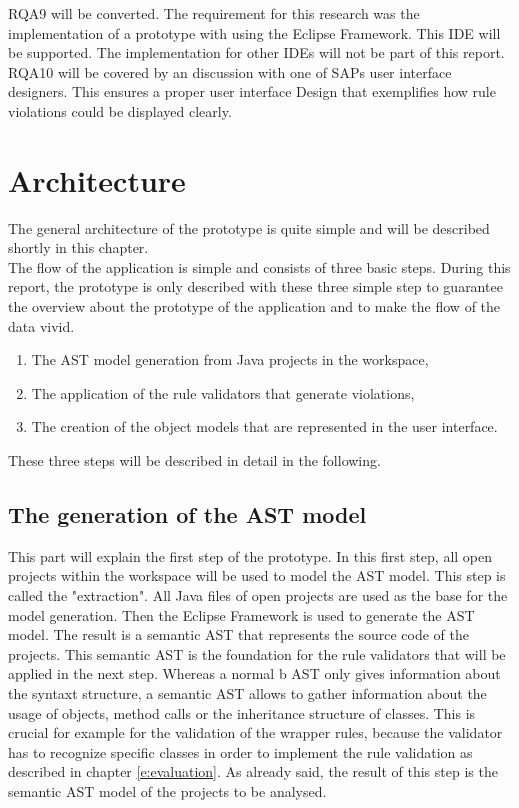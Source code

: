 RQA9 will be converted. The requirement for this research was the implementation of a prototype with using the Eclipse Framework. This \acf{IDE} will be supported. The implementation for other \acf{IDE}s will not be part of this report.
\\

RQA10 will be covered by an discussion with one of SAPs user interface designers. This ensures a proper user interface Design that exemplifies how rule violations could be displayed clearly.
\\

\section{Architecture}
\label{p:architecture}
The general architecture of the prototype is quite simple and will be described shortly in this chapter. 
\\

The flow of the application is simple and consists of three basic steps. During this report, the prototype is only described with these three simple step to guarantee the overview about the prototype of the application and to make the flow of the data vivid.

\begin{enumerate}
  \item The \acf{AST} model generation from Java projects in the workspace,
  \item The application of the rule validators that generate violations,
  \item The creation of the object models that are represented in the user interface. 
\end{enumerate}

These three steps will be described in detail in the following. 

\subsection{The generation of the AST model}
This part will explain the first step of the prototype. In this first step, all open projects within the workspace will be used to model the \acf{AST} model. This step is called the "extraction". All Java files of open projects are used as the base for the model generation. Then the Eclipse Framework is used to generate the  \acf{AST} model. The result is a semantic \acf{AST} that represents the source code of the projects. This semantic \acf{AST}  is the foundation for the rule validators that will be applied in the next step. Whereas a normal b \acf{AST} only gives information about the syntaxt structure, a semantic \acf{AST} allows to gather information about the usage of objects, method calls or the inheritance structure of classes. This is crucial for example for the validation of the wrapper rules, because the validator has to recognize specific classes in order to implement the rule validation as described in chapter \ref{e:evaluation}. As already said, the result of this step is the semantic \acf{AST} model of the projects to be analysed. 

